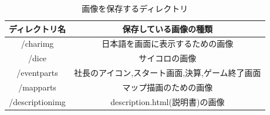 \documentclass[a4j]{jarticle}
\begin{document}
      \begin{table}[H]
        \caption{画像を保存するディレクトリ}
      \label{imgdir}
      \begin{center}
          \begin{tabular}{c|c}\hline
            ディレクトリ名 & 保存している画像の種類 \\ \hline \hline
            /charimg & 日本語を画面に表示するための画像 \\
            /dice & サイコロの画像 \\ 
            /eventparts & 社長のアイコン,スタート画面,決算,ゲーム終了画面 \\ 
            /mapparts & マップ描画のための画像 \\
            /descriptionimg & description.html(説明書)の画像 \\ \hline
          \end{tabular}
      \end{center}
      \end{table}
        
    
\end{document}
